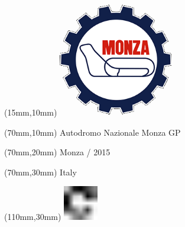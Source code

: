 \null\newpage
\begin{textblock*}{50mm}(15mm,10mm)%
\includegraphics[width=50mm]{LG/MON.png}
\end{textblock*}
\begin{textblock*}{130mm}(70mm,10mm)%
{\fontsize{20}{20}\selectfont Autodromo Nazionale Monza GP}\\
\end{textblock*}
\begin{textblock*}{120mm}(70mm,20mm)%
{\fontsize{16}{16}\selectfont Monza / 2015}\\
\end{textblock*}
\begin{textblock*}{120mm}(70mm,30mm)%
{\fontsize{12}{12}\selectfont Italy}
\end{textblock*}
\begin{textblock*}{30mm}(110mm,30mm)%
\centering
\includegraphics[height=15mm]{icons/fa-rotate-right.pdf}
\end{textblock*}
